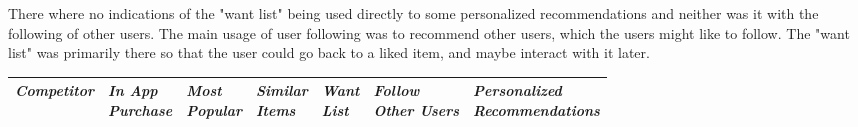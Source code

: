     There where no indications of the "want list" being used directly to some personalized recommendations and neither was it with the following of other users.
    The main usage of user following was to recommend other users, which the users might like to follow.
    The "want list" was primarily there so that the user could go back to a liked item, and maybe interact with it later.
    \begin{table}[H]
        \centering
        \begin{tabular}{l l l l l l l}
            \toprule
            \emph{Competitor} &
            \pbox{5cm}{\emph{In App} \\ \emph{Purchase}} &
            \pbox{5cm}{\emph{Most} \\ \emph{Popular}} &
            \pbox{5cm}{\emph{Similar} \\ \emph{Items}} &
            \pbox{5cm}{\emph{Want} \\ \emph{List}} &
            \pbox{5cm}{\emph{Follow} \\ \emph{Other Users}} &
            \pbox{5cm}{\emph{Personalized} \\ \emph{Recommendations}} \\ \hline


\end{tabular}
\end{table}
